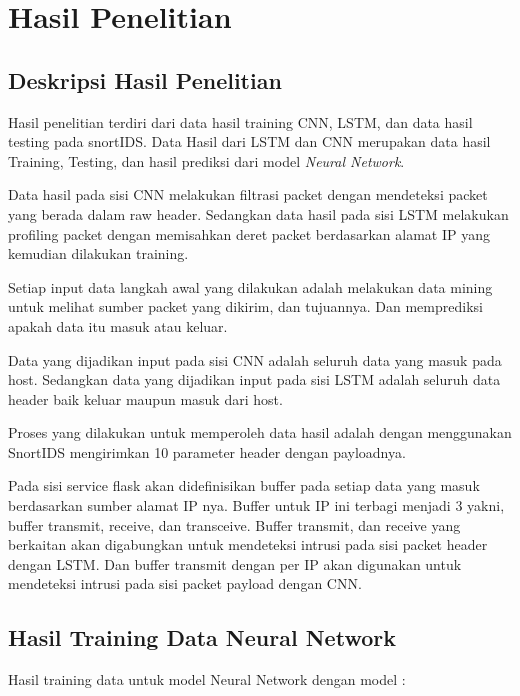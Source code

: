 \documentclass[./skripsi.tex]{subfiles}
\begin{document}
\chapter{Hasil Penelitian}
\section{Deskripsi Hasil Penelitian}
\par Hasil penelitian terdiri dari data hasil training CNN, LSTM, dan data hasil testing pada snortIDS. Data Hasil dari LSTM dan CNN merupakan data hasil Training, Testing, dan hasil prediksi dari model \textit{Neural Network}.
\par Data hasil pada sisi CNN melakukan filtrasi packet dengan mendeteksi packet yang berada dalam raw header. Sedangkan data hasil pada sisi LSTM melakukan profiling packet dengan memisahkan deret packet berdasarkan alamat IP yang kemudian dilakukan training.
\par Setiap input data langkah awal yang dilakukan adalah melakukan data mining untuk melihat sumber packet yang dikirim, dan tujuannya. Dan memprediksi apakah data itu masuk atau keluar.
\par Data yang dijadikan input pada sisi CNN adalah seluruh data yang masuk pada host. Sedangkan data yang dijadikan input pada sisi LSTM adalah seluruh data header baik keluar maupun masuk dari host.
\par Proses yang dilakukan untuk memperoleh data hasil adalah dengan menggunakan SnortIDS mengirimkan 10 parameter header dengan payloadnya.
\par Pada sisi service flask akan didefinisikan buffer pada setiap data yang masuk berdasarkan sumber alamat IP nya. Buffer untuk IP ini terbagi menjadi 3 yakni, buffer transmit, receive, dan transceive. Buffer transmit, dan receive yang berkaitan akan digabungkan untuk mendeteksi intrusi pada sisi packet header dengan LSTM. Dan buffer transmit dengan per IP akan digunakan untuk mendeteksi intrusi pada sisi packet payload dengan CNN. 
\section{Hasil Training Data Neural Network}
\par Hasil training data untuk model Neural Network dengan model :
\end{document}
